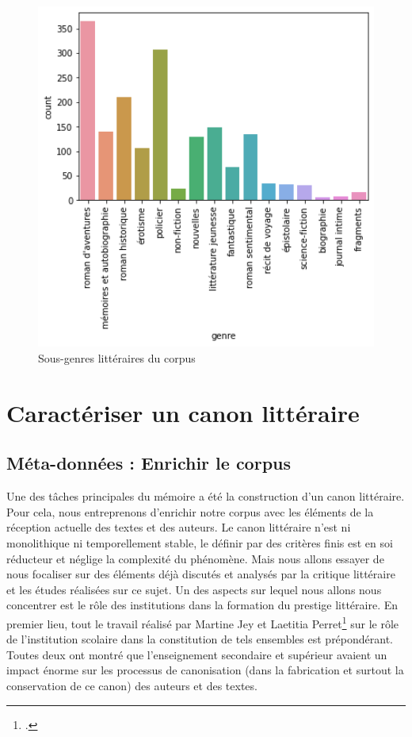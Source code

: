 \bigskip
\begin{figure}[!ht]
    \centering
    \includegraphics[width=15cm]{img/02_genres_corpus.png}
    \caption{Sous-genres littéraires du corpus}
    \label{genres_corpus}
\end{figure}



\chapter{Caractériser un canon littéraire}

\section{Méta-données : Enrichir le corpus}

Une des tâches principales du mémoire a été la construction d'un canon littéraire. Pour cela, nous entreprenons d'enrichir notre corpus avec les éléments de la réception actuelle des textes et des auteurs. Le canon littéraire n'est ni monolithique ni temporellement stable, le définir par des critères finis est en soi réducteur et néglige la complexité du phénomène. Mais nous allons essayer de nous focaliser sur des éléments déjà discutés et analysés par la critique littéraire et les études réalisées sur ce sujet. Un des aspects sur lequel nous allons nous concentrer est le rôle des institutions dans la formation du prestige littéraire. En premier lieu, tout le travail réalisé par Martine Jey et Laetitia Perret\footcites{jey_idee_2019} sur le rôle de l'institution scolaire dans la constitution de tels ensembles est prépondérant. Toutes deux ont montré que l'enseignement secondaire et supérieur avaient un impact énorme sur les processus de canonisation (dans la fabrication et surtout la conservation de ce canon) des auteurs et des textes. 



